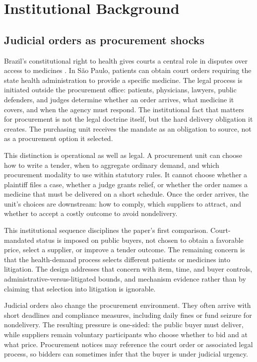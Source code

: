 \section{Institutional Background}
\label{sec:institutional}

\subsection{Judicial orders as procurement shocks}
\label{subsec:litigation}

Brazil's constitutional right to health gives courts a central role
in disputes over access to medicines
\citep{ferraz2009right,wang2015right,cnj2019judicializacao}. In
S\~ao Paulo, patients can obtain court orders requiring the state
health administration to provide a specific medicine. The legal
process is initiated outside the procurement office: patients,
physicians, lawyers, public defenders, and judges determine whether
an order arrives, what medicine it covers, and when the agency must
respond. The institutional fact that matters for procurement is not
the legal doctrine itself, but the hard delivery obligation it
creates. The purchasing unit receives the mandate as an obligation to
source, not as a procurement option it selected.

This distinction is operational as well as legal. A procurement unit
can choose how to write a tender, when to aggregate ordinary demand,
and which procurement modality to use within statutory rules. It
cannot choose whether a plaintiff files a case, whether a judge grants
relief, or whether the order names a medicine that must be delivered
on a short schedule. Once the order arrives, the unit's choices are
downstream: how to comply, which suppliers to attract, and whether to
accept a costly outcome to avoid nondelivery.

This institutional sequence disciplines the paper's first comparison.
Court-mandated status is imposed on public buyers, not chosen to
obtain a favorable price, select a supplier, or improve a tender
outcome. The remaining concern is that the health-demand process
selects different patients or medicines into litigation. The design
addresses that concern with item, time, and buyer controls,
administrative-versus-litigated bounds, and mechanism evidence rather
than by claiming that selection into litigation is ignorable.

Judicial orders also change the procurement environment. They often
arrive with short deadlines and compliance measures, including daily
fines or fund seizure for nondelivery. The resulting pressure is
one-sided: the public buyer must deliver, while suppliers remain
voluntary participants who choose whether to bid and at what price.
Procurement notices may reference the court order or associated legal
process, so bidders can sometimes infer that the buyer is under
judicial urgency.

